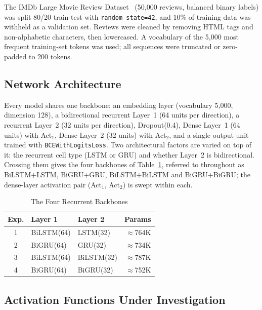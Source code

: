 \documentclass[conference,a4paper]{IEEEtran}
\begin{document}
The IMDb Large Movie Review Dataset~\cite{maas2011} (50,000
reviews, balanced binary labels) was split 80/20 train-test
with \texttt{random\_state=42}, and 10\% of
training data was withheld as a validation set. Reviews were
cleaned by removing HTML tags and non-alphabetic characters,
then lowercased. A vocabulary of the 5,000 most frequent
training-set tokens was used; all sequences were truncated or
zero-padded to 200 tokens.

\subsection{Network Architecture}

Every model shares one backbone: an embedding
layer (vocabulary 5,000, dimension 128), a bidirectional
recurrent Layer~1 (64 units per direction), a recurrent
Layer~2 (32 units per direction), Dropout(0.4), Dense Layer~1
(64 units) with Act$_1$, Dense Layer~2 (32 units) with
Act$_2$, and a single output unit trained with
\texttt{BCEWithLogitsLoss}. Two architectural factors are
varied on top of it: the recurrent cell type (LSTM or GRU)
and whether Layer~2 is bidirectional. Crossing them gives the
four backbones of Table~\ref{tab:architectures}, referred to
throughout as BiLSTM+LSTM, BiGRU+GRU, BiLSTM+BiLSTM and
BiGRU+BiGRU; the dense-layer activation pair (Act$_1$,
Act$_2$) is swept within each.

\begin{table}[htbp]
  \caption{The Four Recurrent Backbones}
  \label{tab:architectures}
  \centering
  \footnotesize
  \setlength{\tabcolsep}{4pt}
  \renewcommand{\arraystretch}{1.08}
  \begin{tabular}{cllr}
    \toprule
    Exp. & Layer 1 & Layer 2 & Params \\
    \midrule
    1 & BiLSTM(64) & LSTM(32)    & ${\approx}$764K \\
    2 & BiGRU(64)  & GRU(32)     & ${\approx}$734K \\
    3 & BiLSTM(64) & BiLSTM(32)  & ${\approx}$787K \\
    4 & BiGRU(64)  & BiGRU(32)   & ${\approx}$752K \\
    \bottomrule
  \end{tabular}
\end{table}

\subsection{Activation Functions Under Investigation}
\end{document}
